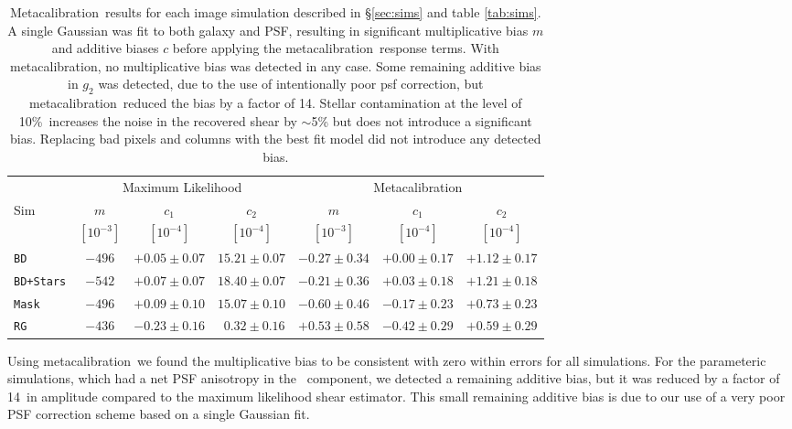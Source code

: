 \documentclass[usegraphicx,usenatbib]{mn2e}
\newcommand{\mcal}{metacalibration}
\newcommand{\Mcal}{Metacalibration}
\newcommand{\nsimNstarperc}{10\%}
\newcommand{\bdsim}{\texttt{BD}}
\newcommand{\bdstar}{\texttt{BD+Stars}}
\newcommand{\bdmask}{\texttt{Mask}}
\newcommand{\rgsim}{\texttt{RG}}
\newcommand{\pimprovement}{14}
\begin{document}
\begin{table}
    \centering
    \caption{\Mcal\ results for each image simulation described in
        \S \ref{sec:sims} and table \ref{tab:sims}.  A single Gaussian was fit
    to both galaxy and PSF, resulting in significant multiplicative 
    bias $m$ and additive biases $c$ before applying the \mcal\ response
    terms. With \mcal, no multiplicative bias was detected in any case. 
    Some remaining additive bias in $g_2$ was detected, due to the use of
    intentionally poor psf correction, but \mcal\ reduced the
    bias by a factor of \pimprovement.
    Stellar contamination at the level of \nsimNstarperc\ increases
    the noise in the recovered shear by $\sim$5\% but does not introduce 
    a significant bias.  Replacing bad pixels and columns with the best fit model
    did not introduce any detected bias.
    \label{tab:results}}
    \begin{tabular}{ |l|  c|c|c|  c|c|c|}
        \hline
        & \multicolumn{3}{c}{Maximum Likelihood}                    & \multicolumn{3}{c}{\Mcal} \\
        Sim    & $m$         & $c_1$            & $c_2$             & $m$               & $c_1$            & $c_2$ \\
               & $[10^{-3}]$ & $[10^{-4}]$      & $[10^{-4}]$       & $[10^{-3}]$       & $[10^{-4}]$      & $[10^{-4}]$ \\
        \hline
        \bdsim & $-496$      & $+0.05 \pm 0.07$ & $ 15.21 \pm 0.07$ & $-0.27 \pm 0.34$  & $+0.00 \pm 0.17$ & $+1.12 \pm 0.17$  \\
        \bdstar& $-542$      & $+0.07 \pm 0.07$ & $ 18.40 \pm 0.07$ & $-0.21 \pm 0.36$  & $+0.03 \pm 0.18$ & $+1.21 \pm 0.18$  \\
        \bdmask& $-496$      & $+0.09 \pm 0.10$ & $ 15.07 \pm 0.10$ & $-0.60 \pm 0.46$  & $-0.17 \pm 0.23$ & $+0.73 \pm 0.23$  \\
        \rgsim & $-436$      & $-0.23 \pm 0.16$ & $~~0.32 \pm 0.16$ & $+0.53 \pm 0.58$  & $-0.42 \pm 0.29$ & $+0.59 \pm 0.29$ \\
    \end{tabular}
\end{table}


Using \mcal\ we found the multiplicative bias to be consistent with zero within
errors for all simulations. For the parameteric simulations, which had a
net PSF anisotropy in the \etwo\ component, we detected a remaining
additive bias, but it was reduced by a factor of \pimprovement\ in amplitude
compared to the maximum likelihood shear estimator.  This small remaining
additive bias is due to our use of a very poor PSF correction scheme based
on a single Gaussian fit.
\end{document}
